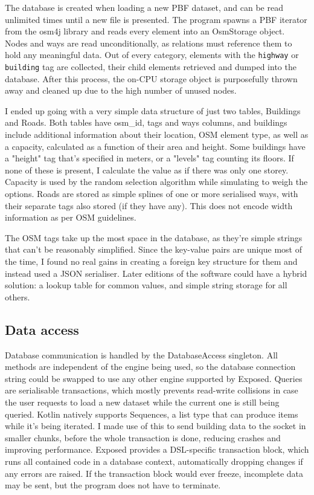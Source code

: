 \label{pbf-loading}
The database is created when loading a new PBF dataset, and can be read unlimited times until a new file is presented. The program spawns a PBF iterator from the osm4j library and reads every element into an OsmStorage object. Nodes and ways are read unconditionally, as relations must reference them to hold any meaningful data. Out of every category, elements with the \verb|highway| or \verb|building| tag are collected, their child elements retrieved and dumped into the database. After this process, the on-CPU storage object is purposefully thrown away and cleaned up due to the high number of unused nodes.

I ended up going with a very simple data structure of just two tables, Buildings and Roads. Both tables have osm\_id, tags and ways columns, and buildings include additional information about their location, OSM element type, as well as a capacity, calculated as a function of their area and height. Some buildings have a "height" tag that's specified in meters, or a "levels" tag counting its floors. If none of these is present, I calculate the value as if there was only one storey. Capacity is used by the random selection algorithm while simulating to weigh the options. Roads are stored as simple splines of one or more serialised ways, with their separate tags also stored (if they have any). This does not encode width information as per OSM guidelines.

The OSM tags take up the most space in the database, as they're simple strings that can't be reasonably simplified. Since the key-value pairs are unique most of the time, I found no real gains in creating a foreign key structure for them and instead used a JSON serialiser. Later editions of the software could have a hybrid solution: a lookup table for common values, and simple string storage for all others.

\subsection{Data access}

Database communication is handled by the DatabaseAccess singleton. All methods are independent of the engine being used, so the database connection string could be swapped to use any other engine supported by Exposed. Queries are serialisable transactions, which mostly prevents read-write collisions in case the user requests to load a new dataset while the current one is still being queried. Kotlin natively supports Sequences, a list type that can produce items while it's being iterated. I made use of this to send building data to the socket in smaller chunks, before the whole transaction is done, reducing crashes and improving performance. Exposed provides a DSL-specific transaction block, which runs all contained code in a database context, automatically dropping changes if any errors are raised. If the transaction block would ever freeze, incomplete data may be sent, but the program does not have to terminate.

